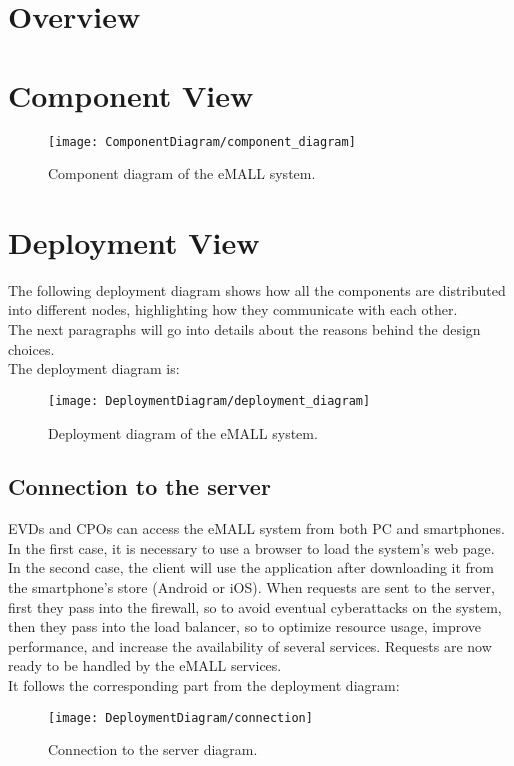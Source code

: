 \section{Overview}
\label{sec: overview}%


\section{Component View}
\label{sec: component_view}%
\begin{figure} [H]
    \begin{center}
        \texttt{[image: ComponentDiagram/component\_diagram]}
        \caption{Component diagram of the eMALL system.}
        \label{fig: cd}
    \end{center}
\end{figure}


\section{Deployment View}
\label{sec: deployment_view}%
The following deployment diagram shows how all the components are distributed into different nodes,
highlighting how they communicate with each other. \\
The next paragraphs will go into details about the reasons behind the design choices. \\
The deployment diagram is:
\begin{figure} [H]
    \begin{center}
        \texttt{[image: DeploymentDiagram/deployment\_diagram]}
        \caption{Deployment diagram of the eMALL system.}
        \label{fig: depl_diagram}
    \end{center}
\end{figure}

\subsection{Connection to the server}
\label{subsec:connection_to_the_server}%
EVDs and CPOs can access the eMALL system from both PC and smartphones.
In the first case, it is necessary to use a browser to load the system's web page.
In the second case, the client will use the application after downloading it from the smartphone's store (Android or iOS).
When requests are sent to the server, first they pass into the firewall, so to avoid eventual cyberattacks on the system,
then they pass into the load balancer, so to optimize resource usage,
improve performance, and increase the availability of several services.
Requests are now ready to be handled by the eMALL services. \\
It follows the corresponding part from the deployment diagram:
\begin{figure} [H]
    \begin{center}
        \texttt{[image: DeploymentDiagram/connection]}
        \caption{Connection to the server diagram.}
        \label{fig: connection}
    \end{center}
\end{figure}


